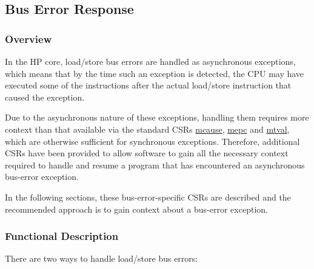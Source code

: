 \documentclass[main\_\_EN.tex]{subfiles}
\begin{document}

\subsection{Bus Error Response}
\label{sec:riscvcpu-bus-err-resp}
\subsubsection{Overview}
\label{sec:riscvcpu-buserr-overview}

In the HP core, load/store bus errors are handled as asynchronous exceptions, which means that by the time such an exception is detected, the CPU may have executed some of the instructions after the actual load/store instruction that caused the exception.

Due to the asynchronous nature of these exceptions, handling them requires more context than that available via the standard CSRs \hyperref[regdesc:MCAUSE]{mcause}, \hyperref[regdesc:MEPC]{mepc} and \hyperref[regdesc:MTVAL]{mtval}, which are otherwise sufficient for synchronous exceptions. Therefore, additional CSRs have been provided to allow software to gain all the necessary context required to handle and resume a program that has encountered an asynchronous bus-error exception.

In the following sections, these bus-error-specific CSRs are described and the recommended approach is to gain context about a bus-error exception.

\subsubsection{Functional Description}
\label{sec:riscvcpu-buserr-func-descr}

There are two ways to handle load/store bus errors:
\end{document}
